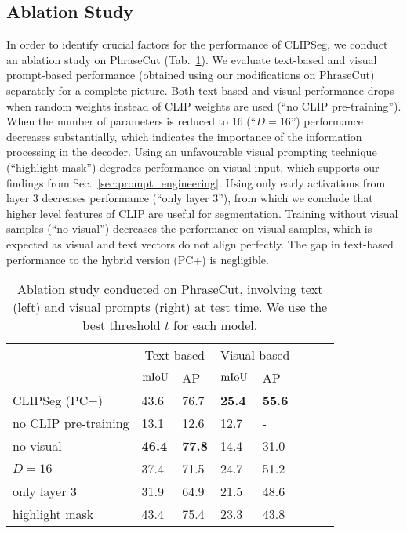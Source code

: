 \documentclass[10pt,twocolumn,letterpaper]{article}
\begin{document}
\subsection{Ablation Study}

In order to identify crucial factors for the performance of CLIPSeg, we conduct an ablation study on PhraseCut (Tab.~\ref{tab:ablation}). We evaluate text-based and visual prompt-based performance (obtained using our modifications on PhraseCut) separately for a complete picture.
Both text-based and visual performance drops when random weights instead of CLIP weights are used (``no CLIP pre-training''). When the number of parameters is reduced to 16 (``$D=16$'') performance decreases substantially, which indicates the importance of the information processing in the decoder.
Using an unfavourable visual prompting technique (``highlight mask'') degrades performance on visual input, which supports our findings from Sec.~\ref{sec:prompt_engineering}. 
Using only early activations from layer 3 decreases performance (``only layer 3''), from which we conclude that higher level features of CLIP are useful for segmentation.
Training without visual samples (``no visual'') decreases the performance on visual samples, which is expected as visual and text vectors do not align perfectly. The gap in text-based performance to the hybrid version (PC+) is negligible.









\begin{table}[t]
    \centering
    \footnotesize
    \begin{tabular}{llllllll}
        \toprule
        & \multicolumn{2}{c}{Text-based} & \multicolumn{2}{c}{Visual-based} \\
         & $\text{mIoU}$ &  AP & $\text{mIoU}$ &  AP   \\
        \midrule
              CLIPSeg (PC+) &  43.6 &  76.7 &  \textbf{25.4} &  \textbf{55.6} \\
 no CLIP pre-training &  13.1 &  12.6 &  12.7 &   - \\
            no visual &  \textbf{46.4} &  \textbf{77.8} &  14.4 &  31.0 \\
                     $D=16$ &  37.4 &  71.5 &  24.7 &  51.2 \\
         only layer 3 &  31.9 &  64.9 &  21.5 &  48.6 \\
       highlight mask &  43.4 &  75.4 &  23.3 &  43.8 \\
        
        \bottomrule
    \end{tabular}
    \caption{Ablation study conducted on PhraseCut, involving text (left) and visual prompts (right) at test time. We use the best threshold $t$ for each model.}
    \label{tab:ablation}
\end{table}
\end{document}
